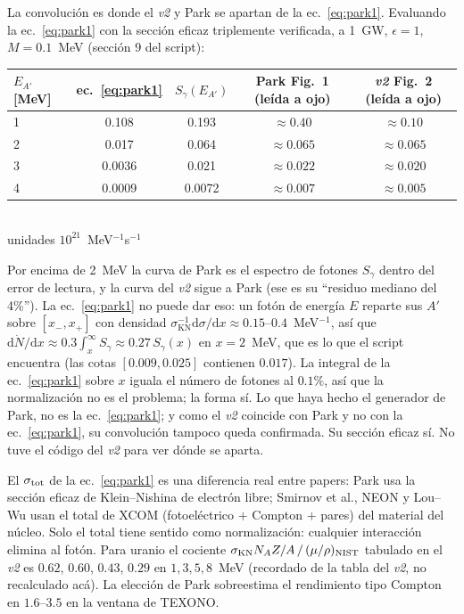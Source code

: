 \documentclass[11pt,a4paper]{article}
\newcommand{\Ap}{A'}
\newcommand{\eps}{\epsilon}
\newcommand{\KN}{\mathrm{KN}}
\newcommand{\dd}{\mathrm{d}}
\begin{document}
La convolución es donde el \emph{v2} y Park se apartan de la ec.~\eqref{eq:park1}. Evaluando la ec.~\eqref{eq:park1}
con la sección eficaz triplemente verificada, a 1~GW, $\eps=1$, $M=0.1$~MeV (sección 9 del script):
\begin{center}\small
\begin{tabular}{@{}lcccc@{}}
\toprule
$E_{\Ap}$ [MeV] & ec.~\eqref{eq:park1} & $S_\gamma(E_{\Ap})$ & Park Fig.~1 (leída a ojo) & \emph{v2} Fig.~2 (leída a ojo)\\
\midrule
1 & 0.108 & 0.193 & $\approx0.40$ & $\approx0.10$\\
2 & 0.017 & 0.064 & $\approx0.065$ & $\approx0.065$\\
3 & 0.0036 & 0.021 & $\approx0.022$ & $\approx0.020$\\
4 & 0.0009 & 0.0072 & $\approx0.007$ & $\approx0.005$\\
\bottomrule
\end{tabular}\\[2pt]
unidades $10^{21}$~MeV$^{-1}$s$^{-1}$
\end{center}
Por encima de 2~MeV la curva de Park es el espectro de fotones $S_\gamma$ dentro del error de lectura, y la curva del
\emph{v2} sigue a Park (ese es su ``residuo mediano del 4\%''). La ec.~\eqref{eq:park1} no puede dar eso: un fotón de
energía $E$ reparte sus $\Ap$ sobre $[x_-,x_+]$ con densidad $\sigma_\KN^{-1}\dd\sigma/\dd x\approx0.15$--$0.4$~MeV$^{-1}$,
así que $\dd\dot N/\dd x\approx0.3\int_x^\infty S_\gamma\approx0.27\,S_\gamma(x)$ en $x=2$~MeV, que es lo que el script
encuentra (las cotas $[0.009,0.025]$ contienen $0.017$). La integral de la ec.~\eqref{eq:park1} sobre $x$ iguala el
número de fotones al $0.1\%$, así que la normalización no es el problema; la forma sí. Lo que haya hecho el generador
de Park, no es la ec.~\eqref{eq:park1}; y como el \emph{v2} coincide con Park y no con la ec.~\eqref{eq:park1}, su
convolución tampoco queda confirmada. Su sección eficaz sí. No tuve el código del \emph{v2} para ver dónde se aparta.

El $\sigma_{\rm tot}$ de la ec.~\eqref{eq:park1} es una diferencia real entre papers: Park usa la sección eficaz de
Klein--Nishina de electrón libre; Smirnov et al., NEON y Lou--Wu usan el total de XCOM (fotoeléctrico $+$ Compton $+$
pares) del material del núcleo. Solo el total tiene sentido como normalización: cualquier interacción elimina al fotón.
Para uranio el cociente $\sigma_\KN N_A Z/A\,/\,(\mu/\rho)_{\rm NIST}$ tabulado en el \emph{v2} es $0.62$, $0.60$, $0.43$,
$0.29$ en $1,3,5,8$~MeV (recordado de la tabla del \emph{v2}, no recalculado acá). La elección de Park sobreestima el
rendimiento tipo Compton en $1.6$--$3.5$ en la ventana de TEXONO.
\end{document}
